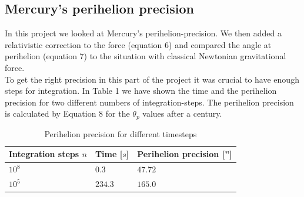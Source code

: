 \documentclass[%
 reprint,
 nobalance,
 amsmath,amssymb,
 aps,
]{revtex4-1}
\begin{document}
\subsection{\label{sec:Sub3}Mercury's perihelion precision}

In this project we looked at Mercury's perihelion-precision. We then added a relativistic correction to the force (equation 6) and compared the angle at perihelion (equation 7) to the situation with classical Newtonian gravitational force.\\
To get the right precision in this part of the project it was crucial to have enough steps for integration. In Table 1 we have shown the time and the perihelion precision for two different numbers of integration-steps. The perihelion precision is calculated by Equation 8 for the $\theta_p$ values after a century.

\begin{table}[h]
\centering
\caption{Perihelion precision for different timesteps}
\label{my-label}
\begin{tabular}{|l|l|l|}
\hline
\textbf{Integration steps $n$} & \textbf{Time {[}$s${]}} & \textbf{Perihelion precision {[}''{]}} \\ \hline
$10^8$                 & $0.3$                   & $47.72$                                \\ \hline
$10^5$                 & $234.3$                 & $165.0$                                \\ \hline
\end{tabular}
\end{table}
\end{document}
